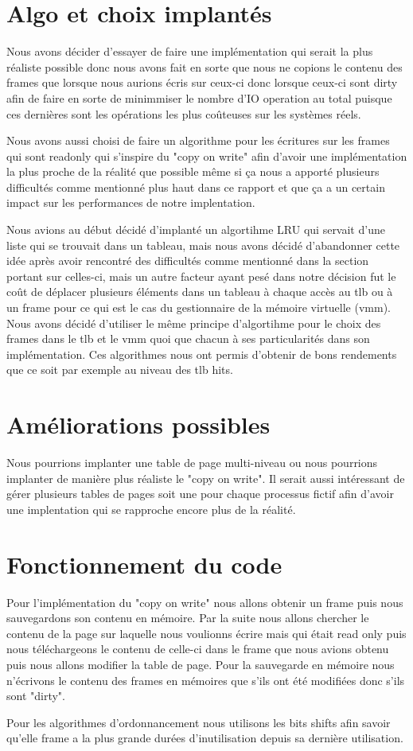 \documentclass{article}
\begin{document}
\section{Algo et choix implantés}
Nous avons décider d'essayer de faire une implémentation qui serait la plus réaliste possible donc nous avons fait en sorte que nous ne copions le contenu des frames que lorsque nous aurions écris sur ceux-ci donc lorsque ceux-ci sont dirty afin de faire en sorte de minimmiser le nombre d'IO operation au total puisque ces dernières sont les opérations les plus coûteuses sur les systèmes réels. 
\par
Nous avons aussi choisi de faire un algorithme pour les écritures sur les frames qui sont readonly qui s'inspire du "copy on write" afin d'avoir une implémentation la plus proche de la réalité que possible même si ça nous a apporté plusieurs difficultés comme mentionné  plus haut dans ce rapport et que ça a un certain impact sur les performances de notre implentation.
\par 
Nous avions au début décidé d'implanté un algortihme LRU qui servait d'une liste qui se trouvait dans un tableau, mais nous avons décidé d'abandonner cette idée après avoir rencontré des difficultés comme mentionné dans la section portant sur celles-ci, mais un autre facteur ayant pesé dans notre décision fut le coût de déplacer plusieurs éléments dans un tableau à chaque accès au tlb ou à un frame pour ce qui est le cas du gestionnaire de la mémoire virtuelle (vmm). Nous avons décidé d'utiliser le même principe d'algortihme pour le choix des frames dans le tlb et le vmm quoi que chacun à ses particularités dans son  implémentation.  Ces algorithmes nous ont permis d'obtenir de bons rendements que ce soit par exemple au niveau des tlb hits.
\section{Améliorations possibles}
Nous pourrions implanter une table de page multi-niveau ou nous pourrions implanter de manière plus réaliste le "copy on write". Il serait aussi intéressant de gérer plusieurs tables de pages soit une pour chaque processus fictif afin d'avoir une implentation qui se rapproche encore plus de la réalité.

\section{Fonctionnement du code}

Pour l'implémentation du "copy on write" nous allons obtenir un frame puis nous sauvegardons son contenu en mémoire. Par la suite nous allons chercher le contenu de la page sur laquelle nous voulionns écrire mais qui était read only puis nous téléchargeons le contenu de celle-ci dans le frame que nous avions obtenu puis nous allons modifier la table de page. Pour la sauvegarde en mémoire nous n'écrivons le contenu des frames en mémoires que s'ils ont été modifiées donc s'ils sont "dirty". 
\par 
Pour les algorithmes d'ordonnancement nous utilisons les bits shifts afin savoir qu'elle frame a la plus grande durées d'inutilisation depuis sa dernière utilisation.
\end{document}
